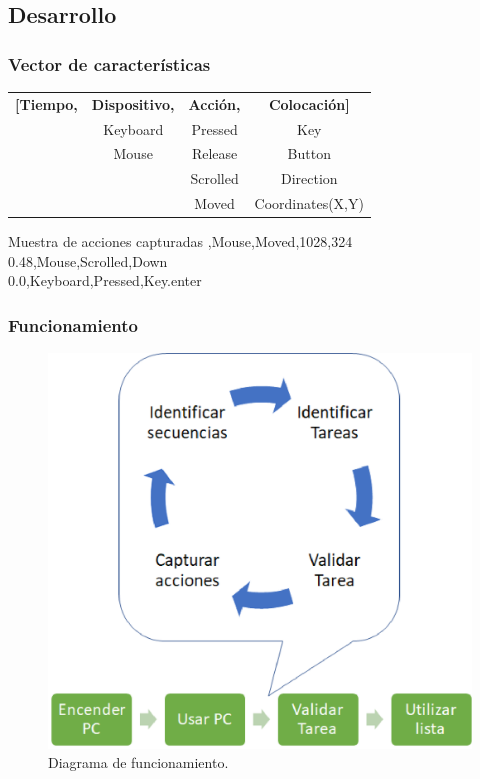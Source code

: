\subsection{Desarrollo}
\begin{frame}
\frametitle{Vector de caracter\'isticas}

\begin{table}[!h]
\centering
\begin{tabular}{cccc}

\textbf{[Tiempo,} 
& \textbf{Dispositivo,} 
& \textbf{Acci\'on,}
& \textbf{Colocaci\'on]}
\\

& Keyboard
& Pressed
& Key
\\

& Mouse
& Release
& Button
\\

& 
& Scrolled
& Direction
\\

& 
& Moved
& Coordinates(X,Y)
\\


\end{tabular}
\end{table}

\begin{block}{\centering Muestra de acciones capturadas}
,Mouse,Moved,1028,324\\
0.48,Mouse,Scrolled,Down\\
0.0,Keyboard,Pressed,Key.enter\\
\end{block}

\end{frame}


\begin{frame}
\frametitle{Funcionamiento}
\begin{figure}[H]
\centering
\includegraphics[width=0.6 \columnwidth]{Imagenes/Funcionamiento.eps}
\caption{Diagrama de funcionamiento.}
\label{fig:funcionamento}
\end{figure}
\end{frame}



